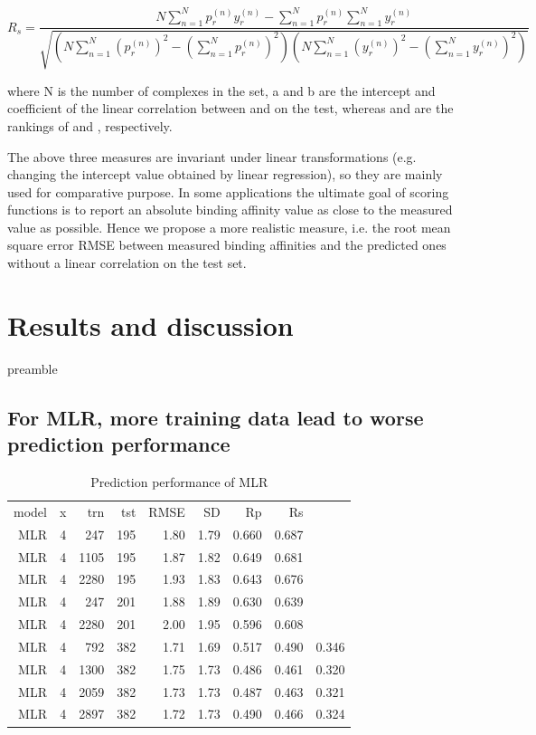 \documentclass[journal=jacsat,manuscript=article]{achemso}
\begin{document}
\begin{equation}
R_s = \frac{N\sum_{n=1}^Np_r^{(n)}y_r^{(n)}-\sum_{n=1}^Np_r^{(n)}\sum_{n=1}^Ny_r^{(n)}}{\sqrt{(N\sum_{n=1}^N(p_r^{(n)})^2-(\sum_{n=1}^Np_r^{(n)})^2)(N\sum_{n=1}^N(y_r^{(n)})^2-(\sum_{n=1}^Ny_r^{(n)})^2)}}
\label{eqn:rs}
\end{equation}

where N is the number of complexes in the set, a and b are the intercept and coefficient of the linear correlation between   and   on the test, whereas   and   are the rankings of   and  , respectively. 

The above three measures are invariant under linear transformations (e.g. changing the intercept value obtained by linear regression), so they are mainly used for comparative purpose. In some applications the ultimate goal of scoring functions is to report an absolute binding affinity value as close to the measured value as possible. Hence we propose a more realistic measure, i.e. the root mean square error RMSE between measured binding affinities and the predicted ones without a linear correlation on the test set.

\section{Results and discussion}

preamble

\subsection{For MLR, more training data lead to worse prediction performance}

\begin{table}
\caption{Prediction performance of MLR}
\label{tbl:performance}
\begin{tabular}{rrrrrrrr}
\hline
model & x & trn & tst & RMSE & SD & Rp & Rs\\
MLR & 4 &  247 & 195 & 1.80 & 1.79 & 0.660 & 0.687\\
MLR & 4 & 1105 & 195 & 1.87 & 1.82 & 0.649 & 0.681\\
MLR & 4 & 2280 & 195 & 1.93 & 1.83 & 0.643 & 0.676\\
MLR & 4 &  247 & 201 & 1.88 & 1.89 & 0.630 & 0.639\\
MLR & 4 & 2280 & 201 & 2.00 & 1.95 & 0.596 & 0.608\\
MLR & 4 &  792 & 382 & 1.71 & 1.69 & 0.517 & 0.490 & 0.346\\
MLR & 4 & 1300 & 382 & 1.75 & 1.73 & 0.486 & 0.461 & 0.320\\
MLR & 4 & 2059 & 382 & 1.73 & 1.73 & 0.487 & 0.463 & 0.321\\
MLR & 4 & 2897 & 382 & 1.72 & 1.73 & 0.490 & 0.466 & 0.324\\
\hline
\end{tabular}
\end{table}
\end{document}
